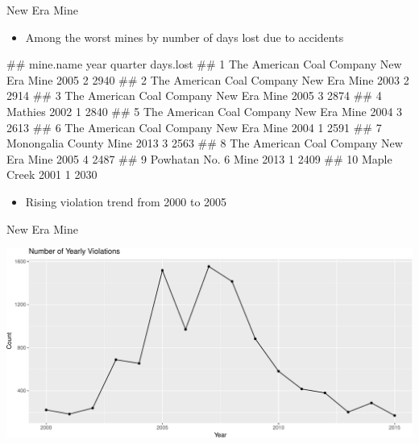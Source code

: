 \documentclass[
]{beamer}
\providecommand{\tightlist}{%
  \setlength{\itemsep}{0pt}\setlength{\parskip}{0pt}}
\let\oldverbatim\verbatim
\let\endoldverbatim\endverbatim
\renewenvironment{verbatim}{\footnotesize\oldverbatim}{\endoldverbatim}
\begin{document}
\begin{frame}[fragile]{New Era Mine}

\begin{itemize}
\tightlist
\item
  Among the worst mines by number of days lost due to accidents
\end{itemize}

\begin{verbatim}
##                                 mine.name year quarter days.lost
## 1  The American Coal Company New Era Mine 2005       2      2940
## 2  The American Coal Company New Era Mine 2003       2      2914
## 3  The American Coal Company New Era Mine 2005       3      2874
## 4                                 Mathies 2002       1      2840
## 5  The American Coal Company New Era Mine 2004       3      2613
## 6  The American Coal Company New Era Mine 2004       1      2591
## 7                  Monongalia County Mine 2013       3      2563
## 8  The American Coal Company New Era Mine 2005       4      2487
## 9                     Powhatan No. 6 Mine 2013       1      2409
## 10                            Maple Creek 2001       1      2030
\end{verbatim}

\begin{itemize}
\tightlist
\item
  Rising violation trend from 2000 to 2005
\end{itemize}

\end{frame}

\begin{frame}{New Era Mine}

\begin{center}\includegraphics{presentation_slides_files/figure-beamer/new era viol-1} \end{center}

\end{frame}
\end{document}
